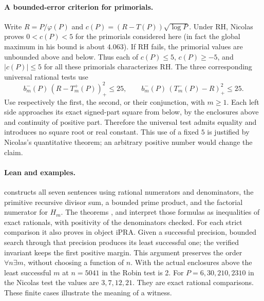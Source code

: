 \paragraph{A bounded-error criterion for primorials.}
Write $R=P/\varphi(P)$ and $c(P)=(R-T(P))\sqrt{\log P}$. Under RH, Nicolas proves $0<c(P)<5$ for the primorials considered here (in fact the global maximum in his bound is about $4.063$). If RH fails, the primorial values are unbounded above and below. Thus each of $c(P)\le5$, $c(P)\ge-5$, and $|c(P)|\le5$ for all these primorials characterizes RH. The three corresponding universal rational tests use
\[
  b^-_m(P)\,(R-T^+_m(P))_+^2\le25,\qquad
  b^-_m(P)\,(T^-_m(P)-R)_+^2\le25.
\]
Use respectively the first, the second, or their conjunction, with $m\ge1$. Each left side approaches its exact signed-part square from below, by the enclosures above and continuity of positive part. Therefore the universal test admits equality and introduces no square root or real constant. This use of a fixed $5$ is justified by Nicolas's quantitative theorem; an arbitrary positive number would change the claim.

\paragraph{Lean and examples.}
 constructs all seven sentences using rational numerators and denominators, the primitive recursive divisor sum, a bounded prime product, and the factorial numerator for $H_m$. The theorems ,  and  interpret those formulas as inequalities of exact rationals, with positivity of the denominators checked. For each strict comparison it also proves  in object iPRA. Given a successful precision, bounded search through that precision produces its least successful one; the verified invariant keeps the first positive margin. This argument preserves the order $\forall n\exists m$, without choosing a function of $n$. With the actual enclosures above the least successful $m$ at $n=5041$ in the Robin test is 2. For $P=6,30,210,2310$ in the Nicolas test the values are $3,7,12,21$. They are exact rational comparisons. These finite cases illustrate the meaning of a witness.
